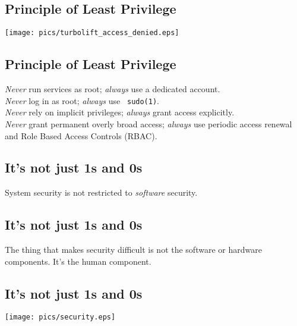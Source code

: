 \documentclass[xga]{xdvislides}
\begin{document}
\subsection{Principle of Least Privilege}
\vspace*{\fill}
\begin{center}
	\texttt{[image: pics/turbolift\_access\_denied.eps]}
\end{center}
\vspace*{\fill}

\subsection{Principle of Least Privilege}

{\em Never} run services as root; {\em always} use a
dedicated account. \\

{\em Never} log in as root; {\em always} use {\tt
sudo(1)}. \\

{\em Never} rely on implicit privileges; {\em always}
grant access explicitly. \\

{\em Never} grant permanent overly broad access; {\em
always} use periodic access renewal and Role Based
Access Controls (RBAC).


\subsection{It's not just 1s and 0s}
\vspace{.5in}
\Huge
\begin{center}
System security is not restricted to {\em software} security.
\end{center}
\Normalsize

\subsection{It's not just 1s and 0s}
\vspace{.5in}
\Huge
\begin{center}
The thing that makes security difficult is not the software or hardware
components.  It's the human component.
\end{center}
\Normalsize

\subsection{It's not just 1s and 0s}
\vspace*{\fill}
\begin{center}
	\texttt{[image: pics/security.eps]}
\end{center}
\vspace*{\fill}
\end{document}
